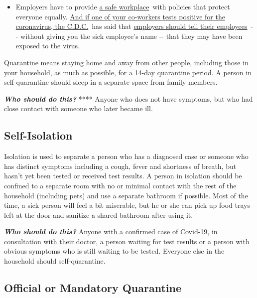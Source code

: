 \begin{itemize}
  \begin{itemize}
  \tightlist
  \item
    Employers have to provide
    \href{https://www.osha.gov/SLTC/covid-19/standards.html}{a safe
    workplace}~with policies that protect everyone equally.
    \href{https://www.nytimes3xbfgragh.onion/article/coronavirus-money-unemployment.html?action=click\&pgtype=Article\&state=default\&region=MAIN_CONTENT_3\&context=storylines_faq}{And
    if one of your co-workers tests positive for the coronavirus, the
    C.D.C.}~has said that
    \href{https://www.cdc.gov/coronavirus/2019-ncov/community/guidance-business-response.html}{employers
    should tell their employees}~-\/- without giving you the sick
    employee's name -\/- that they may have been exposed to the virus.
  \end{itemize}
\end{itemize}

Quarantine means staying home and away from other people, including
those in your household, as much as possible, for a 14-day quarantine
period. A person in self-quarantine should sleep in a separate space
from family members.

\emph{\textbf{Who should do this?}} **** Anyone who does not have
symptoms, but who had close contact with someone who later became ill.

\hypertarget{self-isolation}{%
\subsection{Self-Isolation}\label{self-isolation}}

Isolation is used to separate a person who has a diagnosed case or
someone who has distinct symptoms including a cough, fever and shortness
of breath, but hasn't yet been tested or received test results. A person
in isolation should be confined to a separate room with no or minimal
contact with the rest of the household (including pets) and use a
separate bathroom if possible. Most of the time, a sick person will feel
a bit miserable, but he or she can pick up food trays left at the door
and sanitize a shared bathroom after using it.

\emph{\textbf{Who should do this?}} Anyone with a confirmed case of
Covid-19, in consultation with their doctor, a person waiting for test
results or a person with obvious symptoms who is still waiting to be
tested. Everyone else in the household should self-quarantine.

\hypertarget{official-or-mandatory-quarantine}{%
\subsection{Official or Mandatory
Quarantine}\label{official-or-mandatory-quarantine}}

